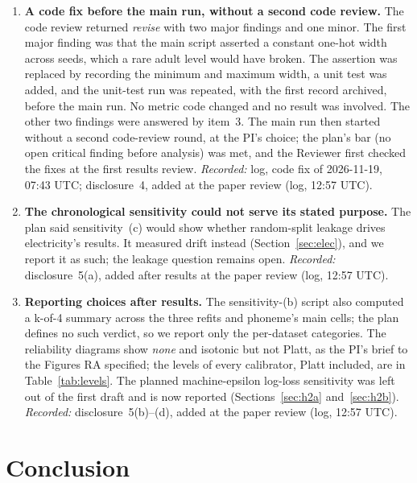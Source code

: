 \documentclass[11pt]{article}
\newcommand{\ds}[1]{\textsf{#1}}
\newcommand{\ad}{\ds{adult}}
\newcommand{\el}{\ds{electricity}}
\newcommand{\ph}{\ds{phoneme}}
\begin{document}
\begin{enumerate}
        human saw it at the results gate. \emph{Recorded:} disclosure~3; log, plan narrowing
        of 2026-11-19, 07:41 UTC.
  \item \textbf{A code fix before the main run, without a second code review.} The code
        review returned \emph{revise} with two major findings and one minor. The first major
        finding was that the main script asserted a constant one-hot width across seeds, which
        a rare \ad{} level would have broken. The assertion was replaced by recording the
        minimum and maximum width, a unit test was added, and the unit-test run was repeated,
        with the first record archived, before the main run. No metric code changed and no
        result was involved. The other two findings were answered by item~3. The main run then
        started without a second code-review round, at the PI's choice; the plan's bar (no
        open critical finding before analysis) was met, and the Reviewer first checked the
        fixes at the first results review. \emph{Recorded:} log, code fix of 2026-11-19,
        07:43 UTC; disclosure~4, added at the paper review (log, 12:57 UTC).
  \item \textbf{The chronological sensitivity could not serve its stated purpose.} The plan
        said sensitivity~(c) would show whether random-split leakage drives \el's results.
        It measured drift instead (Section~\ref{sec:elec}), and we report it as such; the
        leakage question remains open. \emph{Recorded:} disclosure~5(a), added after results
        at the paper review (log, 12:57 UTC).
  \item \textbf{Reporting choices after results.} The sensitivity-(b) script also computed a
        k-of-4 summary across the three refits and \ph's main cells; the plan defines no such
        verdict, so we report only the per-dataset categories. The reliability diagrams show
        \emph{none} and isotonic but not Platt, as the PI's brief to the Figures RA specified;
        the levels of every calibrator, Platt included, are in Table~\ref{tab:levels}. The
        planned machine-epsilon log-loss sensitivity was left out of the first draft and is
        now reported (Sections~\ref{sec:h2a} and~\ref{sec:h2b}). \emph{Recorded:}
        disclosure~5(b)--(d), added at the paper review (log, 12:57 UTC).
\end{enumerate}

\section{Conclusion}
\label{sec:conclusion}
\end{document}
